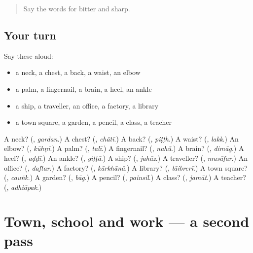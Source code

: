 \label{lesson:PA-R143-first-pass-animals-and-the-body}



\begin{quote}
Say the words for bitter and sharp.
\end{quote}

\subsection*{Your turn}
Say these aloud:

\begin{itemize}
\raggedright
  \item a neck, a chest, a back, a waist, an elbow
  \item a palm, a fingernail, a brain, a heel, an ankle
  \item a ship, a traveller, an office, a factory, a library
  \item a town square, a garden, a pencil, a class, a teacher
\end{itemize}

\begin{tcolorbox}[breakable,colback=teal!4,colframe=teal!35!black,title={Before you move on}]
A neck? (\textbf{}, \emph{gardan}.) A chest? (\textbf{}, \emph{chātī}.) A back? (\textbf{}, \emph{piṭṭh}.) A waist? (\textbf{}, \emph{lakk}.) An elbow? (\textbf{}, \emph{kūhṇī}.) A palm? (\textbf{}, \emph{talī}.) A fingernail? (\textbf{}, \emph{nahũ}.) A brain? (\textbf{}, \emph{dimāg}.) A heel? (\textbf{}, \emph{aḍḍī}.) An ankle? (\textbf{}, \emph{giṭṭā}.) A ship? (\textbf{}, \emph{jahāz}.) A traveller? (\textbf{}, \emph{musāfar}.) An office? (\textbf{}, \emph{daftar}.) A factory? (\textbf{}, \emph{kārkhānā}.) A library? (\textbf{}, \emph{lāibrerī}.) A town square? (\textbf{}, \emph{cauṅk}.) A garden? (\textbf{}, \emph{bāg}.) A pencil? (\textbf{}, \emph{painsil}.) A class? (\textbf{}, \emph{jamāt}.) A teacher? (\textbf{}, \emph{adhiāpak}.)
\end{tcolorbox}
\section[(dialogue)]{Town, school and work — a second pass}

\label{lesson:PA-R143-second-pass-town-school-and-work}




